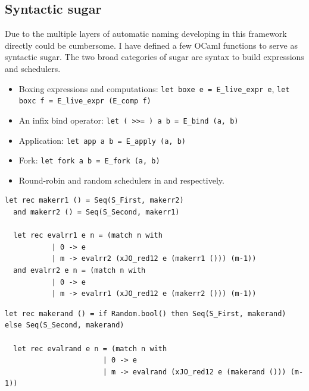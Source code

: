 \documentclass[12pt,twoside,notitlepage]{report}
\theoremstyle{plain}%
\theoremstyle{definition}
\theoremstyle{remark}
\begin{document}
\subsection{Syntactic sugar}
Due to the multiple layers of automatic naming developing in this framework directly could be cumbersome. I have defined a few OCaml functions to serve as syntactic sugar. The two broad categories of sugar are syntax to build expressions and schedulers. 
\begin{itemize}
\item{Boxing expressions and computations: \lstinline|let boxe e = E_live_expr e|, \lstinline|let boxc f = E_live_expr (E_comp f)|}
\item{An infix bind operator: \lstinline|let ( >>= ) a b = E_bind (a, b)|}
\item{Application: \lstinline|let app a b = E_apply (a, b)|}
\item{Fork: \lstinline|let fork a b = E_fork (a, b)|}
\item{Round-robin and random schedulers in  and  respectively.}
\end{itemize}
\begin{minipage}{\linewidth}

\begin{lstlisting}[caption={OCaml round-robin scheduler}, label={lst:ocamlrrsched}]
  let rec makerr1 () = Seq(S_First, makerr2) 
  and makerr2 () = Seq(S_Second, makerr1) 
  
  let rec evalrr1 e n = (match n with 
           | 0 -> e
           | m -> evalrr2 (xJO_red12 e (makerr1 ())) (m-1))
  and evalrr2 e n = (match n with 
           | 0 -> e
           | m -> evalrr1 (xJO_red12 e (makerr2 ())) (m-1))
\end{lstlisting}

\end{minipage}
\begin{minipage}{\linewidth}

\begin{lstlisting}[caption={OCaml random scheduler}, label={lst:ocamlrandsched}]
  let rec makerand () = if Random.bool() then Seq(S_First, makerand) else Seq(S_Second, makerand)
  
  let rec evalrand e n = (match n with 
                       | 0 -> e
                       | m -> evalrand (xJO_red12 e (makerand ())) (m-1))
\end{lstlisting}

\end{minipage}
\end{document}
